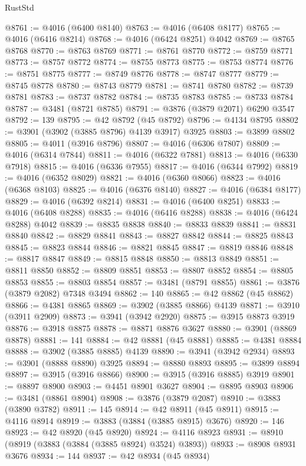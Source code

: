 \begin{lexlean}{RustStd}
\begin{coremodule}
@8761 := @4016 (@6400 @8140)
@8763 := @4016 (@6408 @8177)
@8765 := @4016 (@6416 @8214)
@8768 := @4016 (@6424 @8251) @4042
@8769 := @8765 @8768
@8770 := @8763 @8769
@8771 := @8761 @8770
@8772 := @8759 @8771
@8773 := @8757 @8772
@8774 := @8755 @8773
@8775 := @8753 @8774
@8776 := @8751 @8775
@8777 := @8749 @8776
@8778 := @8747 @8777
@8779 := @8745 @8778
@8780 := @8743 @8779
@8781 := @8741 @8780
@8782 := @8739 @8781
@8783 := @8737 @8782
@8784 := @8735 @8783
@8785 := @8733 @8784
@8787 := @3481 (@8721 @8785)
@8791 := @3876 (@3879 @2071) @6290 @3547
@8792 := 139
@8795 := @42 @8792 (@45 @8792)
@8796 := @4134 @8795
@8802 := @3901 (@3902 (@3885 @8796) @4139 @3917) @3925
@8803 := @3899 @8802
@8805 := @4011 (@3916 @8796)
@8807 := @4016 (@6306 @7807)
@8809 := @4016 (@6314 @7844)
@8811 := @4016 (@6322 @7881)
@8813 := @4016 (@6330 @7918)
@8815 := @4016 (@6336 @7955)
@8817 := @4016 (@6344 @7992)
@8819 := @4016 (@6352 @8029)
@8821 := @4016 (@6360 @8066)
@8823 := @4016 (@6368 @8103)
@8825 := @4016 (@6376 @8140)
@8827 := @4016 (@6384 @8177)
@8829 := @4016 (@6392 @8214)
@8831 := @4016 (@6400 @8251)
@8833 := @4016 (@6408 @8288)
@8835 := @4016 (@6416 @8288)
@8838 := @4016 (@6424 @8288) @4042
@8839 := @8835 @8838
@8840 := @8833 @8839
@8841 := @8831 @8840
@8842 := @8829 @8841
@8843 := @8827 @8842
@8844 := @8825 @8843
@8845 := @8823 @8844
@8846 := @8821 @8845
@8847 := @8819 @8846
@8848 := @8817 @8847
@8849 := @8815 @8848
@8850 := @8813 @8849
@8851 := @8811 @8850
@8852 := @8809 @8851
@8853 := @8807 @8852
@8854 := @8805 @8853
@8855 := @8803 @8854
@8857 := @3481 (@8791 @8855)
@8861 := @3876 (@3879 @2082) @7348 @3494
@8862 := 140
@8865 := @42 @8862 (@45 @8862)
@8866 := @4381 @8865
@8869 := @3902 (@3885 @8866) @4139
@8871 := @3910 (@3911 @2909)
@8873 := @3941 (@3942 @2920)
@8875 := @3915 @8873 @3919
@8876 := @3918 @8875
@8878 := @8871 @8876 @3627
@8880 := @3901 (@8869 @8878)
@8881 := 141
@8884 := @42 @8881 (@45 @8881)
@8885 := @4381 @8884
@8888 := @3902 (@3885 @8885) @4139
@8890 := @3941 (@3942 @2934)
@8893 := @3901 (@8888 @8890) @3925
@8894 := @8880 @8893
@8895 := @3899 @8894
@8897 := @3915 (@3916 @8866)
@8900 := @3915 (@3916 @8885) @3919
@8901 := @8897 @8900
@8903 := @4451 @8901 @3627
@8904 := @8895 @8903
@8906 := @3481 (@8861 @8904)
@8908 := @3876 (@3879 @2087)
@8910 := @3883 (@3890 @3782)
@8911 := 145
@8914 := @42 @8911 (@45 @8911)
@8915 := @4116 @8914
@8919 := @3883 (@3884 (@3885 @8915) @3676)
@8920 := 146
@8923 := @42 @8920 (@45 @8920)
@8924 := @4116 @8923
@8931 := @8910 (@8919 (@3883 (@3884 (@3885 @8924) @3524) @3893))
@8933 := @8908 @8931 @3676
@8934 := 144
@8937 := @42 @8934 (@45 @8934)

\end{coremodule}
\end{lexlean}
